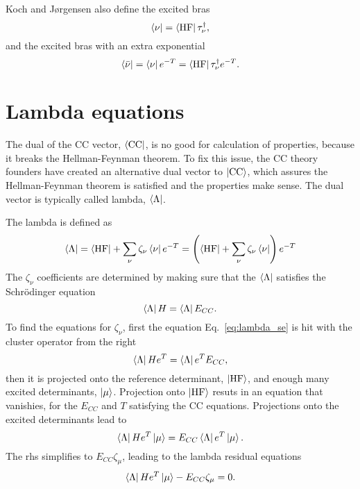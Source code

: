\documentclass{article}
\begin{document}
Koch and J{\o}rgensen\autocite{kochCoupledClusterResponse1990} also define the
excited bras
\begin{equation}
    \bra{\nu} = \bra{\text{HF}} \tau ^\dagger _\nu,
    \label{eq:bra_nu}
\end{equation}
and the excited bras with an extra exponential
\begin{equation}
    \bra{\bar{\nu}} 
    = \bra{\nu} e ^{-T}
    = \bra{\text{HF}} \tau ^\dagger _\nu e ^{-T}.
    \label{eq:bra_nu_bar}
\end{equation}

\section{Lambda equations}
The dual of the CC vector, $\bra{\text{CC}}$, is no good for calculation of
properties, because it breaks the Hellman-Feynman
theorem.\autocite{helgakerMolecularElectronicstructureTheory2000} To fix this
issue, the CC theory founders have created an alternative dual vector to
$\ket{\text{CC}}$, which assures the Hellman-Feynman theorem is satisfied and
the properties make sense. The dual vector is typically called lambda,
$\bra{\Lambda}$.

The lambda is defined as
\begin{equation}
        \bra{\Lambda}
        =
        \bra{\text{HF}} 
        +
        \sum _{\nu}
        \zeta _\nu \bra{\nu} e^{-T}
    =
    \left(
        \bra{\text{HF}}
        +
        \sum _{\nu}
        \zeta _\nu \bra{\nu} 
    \right)e^{-T}
    \label{eq:lambda}
\end{equation}
The $\zeta _\nu$ coefficients are determined by making sure that the
$\bra{\Lambda}$ satisfies the Schr\"odinger equation
\begin{equation}
    \bra{\Lambda} H = \bra{\Lambda} E _{CC}.
    \label{eq:lambda_se}
\end{equation}
To find the equations for $\zeta _\nu$, first the equation
Eq.~\eqref{eq:lambda_se} is hit with the cluster operator from the right
\begin{equation}
    \bra{\Lambda} H e^T = \bra{\Lambda} e^T E _{CC},
    \label{eq:lambda_se_eT}
\end{equation}
then it is projected onto the reference determinant, $\ket{\text{HF}}$, and
enough many excited determinants, $\ket{\mu}$. Projection onto
$\ket{\text{HF}}$ resuts in an equation that vanishies, for the $E _{CC}$ and
$T$ satisfying the CC equations. Projections onto the excited determinants
lead to
\begin{equation}
    \bra{\Lambda}H e^T \ket{\mu}
    =
    E _{CC}
    \bra{\Lambda}
    e ^T
    \ket{\mu}.
    \label{eq:zeta_eq}
\end{equation}
The rhs simplifies to $E _{CC} \zeta _\mu$, leading to the lambda residual
equations
\begin{equation}
    \bra{\Lambda}H e^T \ket{\mu}
    -
    E _{CC} \zeta _{\mu}
    = 
    0.
    \label{eq:lambda_residual}
\end{equation}
\end{document}
